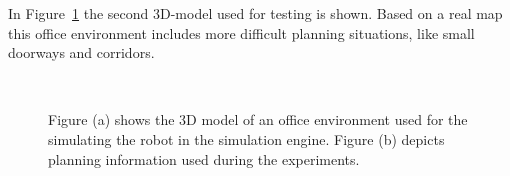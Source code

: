 In Figure~\ref{fig:gazebo_gh25} the second 3D-model used for testing is shown. Based on a real map this office environment includes more difficult planning situations, like small doorways and corridors.

\begin{figure}[thpb]
     \footnotesize
      \centering
      \myfloatalign
      \setlength\fboxsep{0pt}
      \setlength\fboxrule{0.5pt}
       \\
       \caption[Simulation: office environment]{Figure (a) shows the 3D model of an office environment used for the simulating the robot in the simulation engine. Figure (b) depicts planning information used during the experiments.}
      \label{fig:gazebo_gh25}
   \end{figure}

